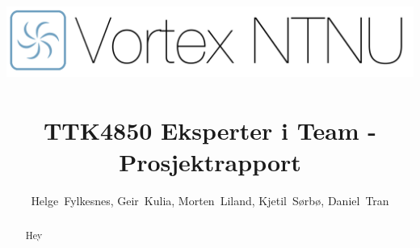 \documentclass[journal]{IEEEtran}
\begin{document}
\title{
\includegraphics[scale=0.03,right]{img/logo-svart.png}
\\ \\
TTK4850 Eksperter i Team - Prosjektrapport}

\author{Helge~Fylkesnes,
		Geir~Kulia,
		Morten~Liland,
		Kjetil~Sørbø,
		Daniel~Tran}



\markright{}{}

\maketitle

\begin{abstract}
    Hey
\end{abstract}





\end{document}
